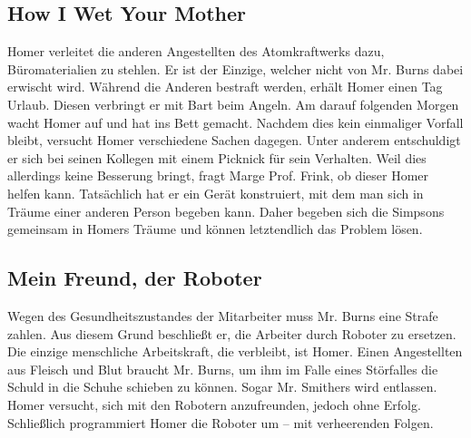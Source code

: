 
\subsection{How I Wet Your Mother}
Homer verleitet die anderen Angestellten des Atomkraftwerks dazu, Büro\-ma\-terial\-ien zu stehlen. Er ist der Einzige, welcher nicht von Mr. Burns dabei erwischt wird. Während die Anderen bestraft werden, erhält Homer einen Tag Urlaub. Diesen verbringt er mit Bart beim Angeln. Am darauf folgenden Morgen wacht Homer auf und hat ins Bett gemacht. Nachdem dies kein einmaliger Vorfall bleibt, versucht Homer verschiedene Sachen dagegen. Unter anderem entschuldigt er sich bei seinen Kollegen mit einem Picknick für sein Verhalten. Weil dies allerdings keine Besserung bringt, fragt Marge Prof. Frink, ob dieser Homer helfen kann. Tatsächlich hat er ein Gerät konstruiert, mit dem man sich in Träume einer anderen Person begeben kann. Daher begeben sich die Simpsons gemeinsam in Homers Träume und können letztendlich das Problem lösen. 


\subsection{Mein Freund, der Roboter}
Wegen des Gesundheitszustandes der Mitarbeiter muss Mr. Burns eine Strafe zahlen. Aus diesem Grund beschließt er, die Arbeiter durch Roboter zu ersetzen. Die einzige menschliche Arbeitskraft, die verbleibt, ist Homer. Einen Angestellten aus Fleisch und Blut braucht Mr. Burns, um ihm im Falle eines Störfalles die Schuld in die Schuhe schieben zu können. Sogar Mr. Smithers wird entlassen. Homer versucht, sich mit den Robotern anzufreunden, jedoch ohne Erfolg. Schließlich programmiert Homer die Roboter um -- mit verheerenden Folgen.

